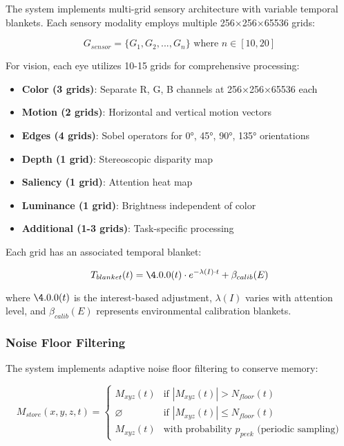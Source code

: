\documentclass[11pt,letterpaper]{article}
\begin{document}
The system implements multi-grid sensory architecture with variable temporal blankets. Each sensory modality employs multiple 256×256×65536 grids:

\begin{equation}
G_{sensor} = \{G_1, G_2, ..., G_n\} \text{ where } n \in [10,20]
\end{equation}

For vision, each eye utilizes 10-15 grids for comprehensive processing:
\begin{itemize}
\item \textbf{Color (3 grids)}: Separate R, G, B channels at 256×256×65536 each
\item \textbf{Motion (2 grids)}: Horizontal and vertical motion vectors
\item \textbf{Edges (4 grids)}: Sobel operators for 0°, 45°, 90°, 135° orientations
\item \textbf{Depth (1 grid)}: Stereoscopic disparity map
\item \textbf{Saliency (1 grid)}: Attention heat map
\item \textbf{Luminance (1 grid)}: Brightness independent of color
\item \textbf{Additional (1-3 grids)}: Task-specific processing
\end{itemize}

Each grid has an associated temporal blanket:

\begin{equation}
T_{blanket}(t) = \4.0.0(t) \cdot e^{-\lambda(I) \cdot t} + \beta_{calib}(E)
\end{equation}

where $\4.0.0(t)$ is the interest-based adjustment, $\lambda(I)$ varies with attention level, and $\beta_{calib}(E)$ represents environmental calibration blankets.

\subsubsection{Noise Floor Filtering}

The system implements adaptive noise floor filtering to conserve memory:

\begin{equation}
M_{store}(x,y,z,t) = \begin{cases}
M_{xyz}(t) & \text{if } |M_{xyz}(t)| > N_{floor}(t) \\
\varnothing & \text{if } |M_{xyz}(t)| \leq N_{floor}(t) \\
M_{xyz}(t) & \text{with probability } p_{peek} \text{ (periodic sampling)}
\end{cases}
\end{equation}
\end{document}

